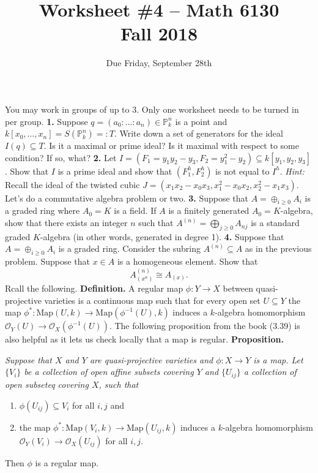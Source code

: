 \documentclass[11pt]{amsart}
\theoremstyle{theorem}
\renewcommand{\O}{\mathcal O}
\renewcommand{\to}[1][]{\xrightarrow{\ #1\ }}
\newcommand{\bP}{\mathbb{P}}
\newcommand{\Map}{{\mathrm{Map}}}
\begin{document}
\title{Worksheet \#4 -- Math 6130\\Fall 2018}
\author{Due Friday, September 28th}

\maketitle
You may work in groups of up to 3.  Only one worksheet needs to be turned in per group.
\vskip 9pt
\noindent
{\bf 1.}  Suppose $q = (a_0 : \ldots : a_n) \in \bP^n_k$ is a point and $k[x_0, \dots, x_n] = S(\bP^n_k) =: T$.  Write down a set of generators for the ideal $I(q) \subseteq T$.  Is it a maximal or prime ideal?  Is it maximal with respect to some condition? If so, what?
\vskip 120pt
\noindent
{\bf 2.}  Let $I = (F_1 = y_1 y_2 - y_3, F_2 = y_1^2 - y_2) \subseteq k[y_1, y_2, y_3]$.  Show that $I$ is a prime ideal and show that $(F_1^h, F_2^h)$ is not equal to $I^h$.
\vskip 9pt
\emph{Hint:}  Recall the ideal of the twisted cubic $J = (x_1 x_2 - x_0 x_3, x_1^2 - x_0 x_2, x_2^2 - x_1 x_3)$.
\newpage
Let's do a commutative algebra problem or two.
\vskip 9pt
\noindent
{\bf 3.}  Suppose that $A = \oplus_{i \geq 0} A_i$ is a graded ring where $A_0 = K$ is a field.  If $A$ is a finitely generated $A_0 = K$-algebra, show that there exists an integer $n$ such that $A^{(n)} = \bigoplus_{j \geq 0} A_{nj}$ is a standard graded $K$-algebra (in other words, generated in degree 1).
\vskip 200pt
\noindent
{\bf 4.}  Suppose that $A = \oplus_{i \geq 0} A_i$ is a graded ring.  Consider the subring $A^{(n)} \subseteq A$ as in the previous problem.  Suppose that $x \in A$ is a homogeneous element.  Show that
\[
A^{(n)}_{(x^n)} \cong A_{(x)}.
\]
\newpage
Rcall the following.  
\vskip 9pt
\noindent
{\bf Definition.} A regular map $\phi : Y \to X$ between quasi-projective varieties is a continuous map such that for every open set $U \subseteq Y$ the map $\phi^* : \Map(U, k) \to \Map(\phi^{-1}(U), k)$ induces a $k$-algebra homomorphism $\O_Y(U) \to \O_X(\phi^{-1}(U))$.  
\vskip 9pt
The following proposition from the book (3.39) is also helpful as it lets us check locally that a map is regular.  
\vskip 9pt
\noindent
{\bf Proposition.}  {\it Suppose that $X$ and $Y$ are quasi-projective varieties and $\phi : X \to Y$ is a map.  Let $\{V_i\}$ be a collection of open affine subsets covering $Y$ and $\{U_{ij}\}$ a collection of open subseteq covering $X$, such that
\begin{enumerate}
\item $\phi(U_{ij}) \subseteq V_i$ for all $i, j$ and
\item the map $\phi^* : \Map(V_i, k) \to \Map(U_{ij}, k)$ induces a $k$-algebra homomorphism $\O_Y(V_i) \to \O_X(U_{ij})$ for all $i, j$.  
\end{enumerate}
Then $\phi$ is a regular map.}
\end{document}
